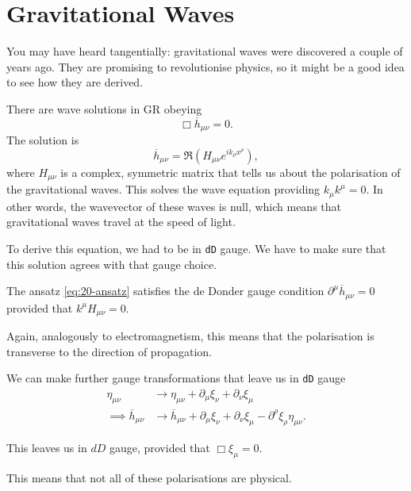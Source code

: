 \section{Gravitational Waves}%
\label{sec:gravitational_waves}

You may have heard tangentially: gravitational waves were discovered a couple of years ago. They are promising to revolutionise physics, so it might be a good idea to see how they are derived.

There are wave solutions in GR obeying
\begin{equation}
  \Box \overline{h} _{\mu\nu} = 0.
\end{equation}
The solution is 
\begin{equation}
  \overline{h}_{\mu\nu} = \Re(H_{\mu\nu} e^{i k_{\rho} x^{\rho}}), \label{eq:20-ansatz}
\end{equation}
where $H_{\mu\nu}$ is a complex, symmetric matrix that tells us about the polarisation of the gravitational waves.
This solves the wave equation providing $k_{\mu} k^{\mu} = 0$. In other words, the wavevector of these waves is null, which means that gravitational waves travel at the speed of light.

To derive this equation, we had to be in \texttt{dD} gauge. We have to make sure that this solution agrees with that gauge choice.
\begin{claim}
  The ansatz \eqref{eq:20-ansatz} satisfies the de Donder gauge condition $\partial^{\mu} \overline{h}_{\mu\nu} = 0$ provided that $k^{\mu} H_{\mu\nu} = 0$.
\end{claim}

\begin{remark}
  Again, analogously to electromagnetism, this means that the polarisation is transverse to the direction of propagation.
\end{remark}

We can make further gauge transformations that leave us in \texttt{dD} gauge
\begin{align}
  \eta_{\mu\nu} &\to \eta_{\mu\nu} + \partial_{\mu} \xi_{\nu} + \partial_{\nu} \xi_{\mu} \\
  \implies \overline{h}_{\mu\nu} &\to \overline{h}_{\mu\nu} + \partial_{\mu} \xi_{\nu} +  \partial_{\nu} \xi_{\mu} - \partial^{\rho} \xi_{\rho} \eta_{\mu\nu}.
\end{align}

This leaves us in $dD$ gauge, provided that $\Box \xi_{\mu} = 0$.

\begin{remark}
  This means that not all of these polarisations are physical.
\end{remark}

